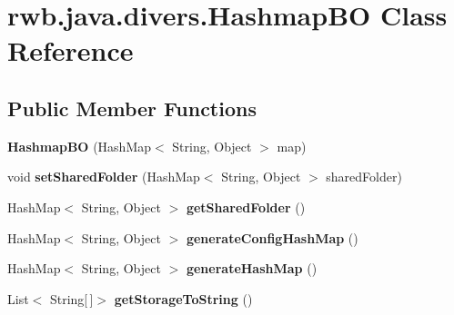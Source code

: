 \hypertarget{classrwb_1_1java_1_1divers_1_1_hashmap_b_o}{}\section{rwb.\+java.\+divers.\+Hashmap\+BO Class Reference}
\label{classrwb_1_1java_1_1divers_1_1_hashmap_b_o}
\subsection*{Public Member Functions}
\begin{DoxyCompactItemize}
\item 
\mbox{\label{classrwb_1_1java_1_1divers_1_1_hashmap_b_o_a921bb5b7f735e7055a2faa86d6fb50eb}} 
{\bfseries Hashmap\+BO} (Hash\+Map$<$ String, Object $>$ map)
\item 
\mbox{\label{classrwb_1_1java_1_1divers_1_1_hashmap_b_o_a01420a9e54fb3daf2c0ca8cf45a77c64}} 
void {\bfseries set\+Shared\+Folder} (Hash\+Map$<$ String, Object $>$ shared\+Folder)
\item 
\mbox{\label{classrwb_1_1java_1_1divers_1_1_hashmap_b_o_a127d1e9aeab9aaf1a29badba5b967fbd}} 
Hash\+Map$<$ String, Object $>$ {\bfseries get\+Shared\+Folder} ()
\item 
\mbox{\label{classrwb_1_1java_1_1divers_1_1_hashmap_b_o_a7116595d99e7bba77bd8cf495a8a8573}} 
Hash\+Map$<$ String, Object $>$ {\bfseries generate\+Config\+Hash\+Map} ()
\item 
\mbox{\label{classrwb_1_1java_1_1divers_1_1_hashmap_b_o_ab546e9a4c559388f3850081eea1d6f0b}} 
Hash\+Map$<$ String, Object $>$ {\bfseries generate\+Hash\+Map} ()
\item 
\mbox{\label{classrwb_1_1java_1_1divers_1_1_hashmap_b_o_a51805cd02e7a57b1068248291cf49103}} 
List$<$ String\mbox{[}$\,$\mbox{]}$>$ {\bfseries get\+Storage\+To\+String} ()
\item 
\mbox{\label{classrwb_1_1java_1_1divers_1_1_hashmap_b_o_a27af76ab761ba19436bdd16d1654510f}} 

\end{DoxyCompactItemize}
